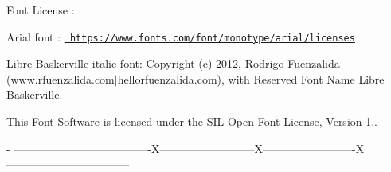 Font License \+:

Arial font \+: \href{https://www.fonts.com/font/monotype/arial/licenses}{\texttt{ https\+://www.\+fonts.\+com/font/monotype/arial/licenses}}

Libre Baskerville italic font\+: Copyright (c) 2012, Rodrigo Fuenzalida (www.\+rfuenzalida.\+com$\vert$hello{\ucr}rfuenzalida.com), with Reserved Font Name Libre Baskerville.

This Font Software is licensed under the SIL Open Font License, Version 1.. 
 \begin{DoxyVerb}           - -------------------------------------X--------------------------X-------------------------X---------------------------------
\end{DoxyVerb}
 